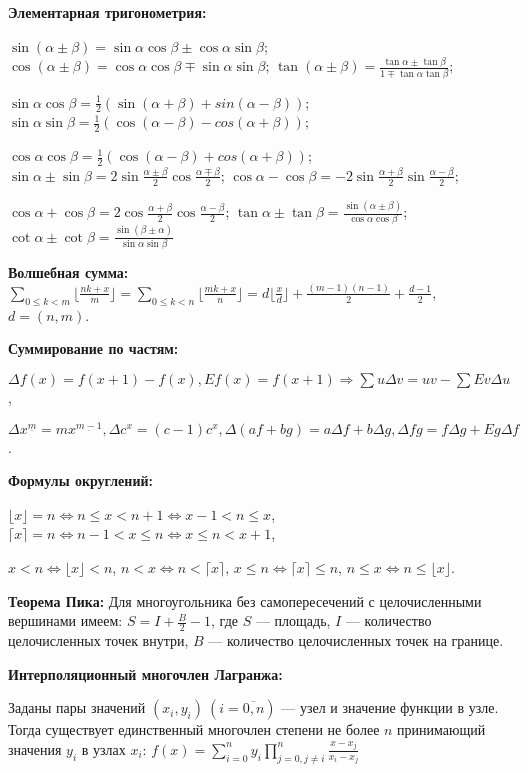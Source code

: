 \textbf{Элементарная тригонометрия:}

$\sin(\alpha\pm\beta)=\sin\alpha\cos\beta\pm\cos\alpha\sin\beta$;
$\cos(\alpha\pm\beta)=\cos\alpha\cos\beta\mp\sin\alpha\sin\beta$;
$\tan(\alpha\pm\beta)=\frac{\tan\alpha\pm\tan\beta}{1\mp\tan\alpha\tan\beta}$;

$\sin\alpha\cos\beta=\frac{1}{2}(\sin(\alpha+\beta)+sin(\alpha-\beta))$;
$\sin\alpha\sin\beta=\frac{1}{2}(\cos(\alpha-\beta)-cos(\alpha+\beta))$;

$\cos\alpha\cos\beta=\frac{1}{2}(\cos(\alpha-\beta)+cos(\alpha+\beta))$;
$\sin\alpha\pm\sin\beta=2\sin\frac{\alpha\pm\beta}{2}\cos\frac{\alpha\mp\beta}{2}$;
$\cos\alpha-\cos\beta=-2\sin\frac{\alpha+\beta}{2}\sin\frac{\alpha-\beta}{2}$;

$\cos\alpha+\cos\beta=2\cos\frac{\alpha+\beta}{2}\cos\frac{\alpha-\beta}{2}$;
$\tan\alpha\pm\tan\beta=\frac{\sin(\alpha\pm\beta)}{\cos\alpha\cos\beta}$;
$\cot\alpha\pm\cot\beta=\frac{\sin(\beta\pm\alpha)}{\sin\alpha\sin\beta}$

\textbf{Волшебная сумма:}
$\sum\limits_{0\le k < m} \lfloor \frac{nk+x}m \rfloor = \sum\limits_{0\le k < n} \lfloor \frac{mk+x}n \rfloor = d\lfloor \frac xd \rfloor +
\frac{(m-1)(n-1)}2 +\frac{d-1}2$, $d = (n, m)$.

\textbf{Суммирование по частям:}

$\Delta f(x)=f(x+1)-f(x), E f(x)=f(x+1) \Rightarrow \sum u\Delta v=uv-\sum Ev\Delta u$,

$\Delta x^{\underline{m}}=m x^{\underline{m-1}}, \Delta c^x=(c-1)c^x, \Delta (af+bg)=a\Delta f+b\Delta g, \Delta fg=f\Delta g+Eg\Delta f$.

\textbf{Формулы округлений:}

$\lfloor x \rfloor=n \Leftrightarrow n\le x < n+1 \Leftrightarrow x-1<n\le x$,
$\lceil x \rceil=n \Leftrightarrow n-1<x\le n \Leftrightarrow x\le n < x+1$,

$x<n\Leftrightarrow \lfloor x\rfloor < n$,
$n<x\Leftrightarrow n<\lceil x \rceil$,
$x\le n \Leftrightarrow \lceil x \rceil \le n$,
$n\le x \Leftrightarrow n\le \lfloor x \rfloor$.


\textbf{Теорема Пика:} Для многоугольника без самопересечений с целочисленными вершинами имеем:
$\displaystyle S = I + \frac{B}2 - 1$, где $S$ --- площадь, $I$ --- количество целочисленных точек внутри,
$B$ --- количество целочисленных точек на границе.

\textbf{Интерполяционный многочлен Лагранжа:}

Заданы пары значений $(x_i,y_i)\ (i=\overline{0,n})$ --- узел и значение функции в узле. Тогда существует единственный многочлен
степени не более $n$ принимающий значения $y_i$ в узлах $x_i$:
$f(x)=\sum\limits_{i=0}^n y_i \prod\limits_{j=0,j\ne i}^n \frac{x-x_j}{x_i-x_j}$


